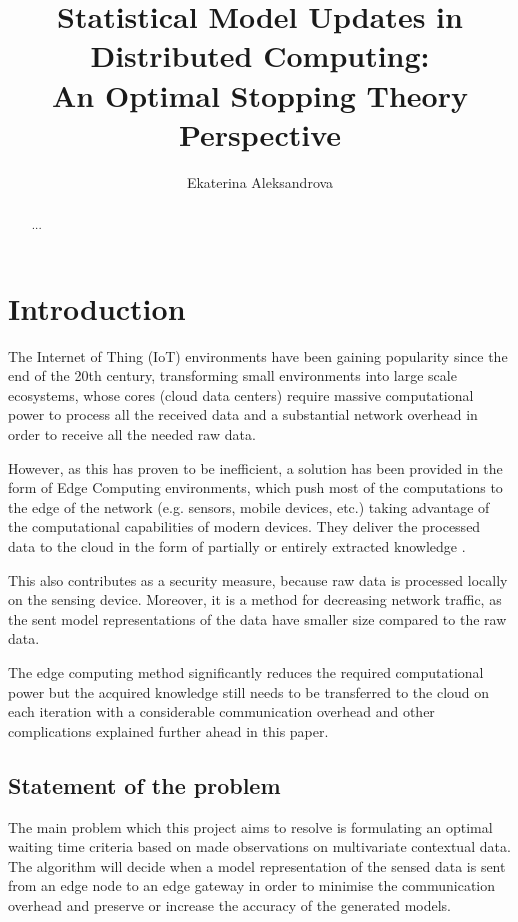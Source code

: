 \documentclass{mpaper}
\begin{document}
\title{Statistical Model Updates in Distributed Computing:\\ An Optimal Stopping Theory Perspective}
\author{Ekaterina Aleksandrova}

\maketitle

\begin{abstract}
...
\end{abstract}

\section{Introduction}

The Internet of Thing (IoT) environments have been gaining popularity since the end of the 20th century, transforming small environments into large scale ecosystems, 
whose cores (cloud data centers) require massive computational 
power to process all the received data and a substantial network overhead in order to receive all the needed raw data.

However, as this has proven to be inefficient, a solution has been provided in the form of Edge Computing environments, which push most of the computations to the edge of the network (e.g. sensors, mobile devices, etc.) taking advantage of the computational capabilities of modern devices. They deliver the processed data to the cloud in the form of partially or entirely extracted knowledge \cite{anagnostop2014}.

This also contributes as a security measure, because raw data is processed locally on the sensing device. Moreover, it is a method for decreasing network traffic, as the sent model representations of the data have smaller size compared to the raw data.

The edge computing method significantly reduces the required computational power but the acquired knowledge still needs to be transferred to the cloud on each iteration with a considerable communication overhead and other complications explained further ahead in this paper. 

\subsection*{Statement of the problem}
The main problem which this project aims to resolve is formulating an optimal waiting time criteria based on made observations on multivariate contextual data. The algorithm will decide when a model representation of the sensed data is sent from an edge node to an edge gateway in order to minimise the communication overhead and preserve or increase the accuracy of the generated models.
\end{document}
